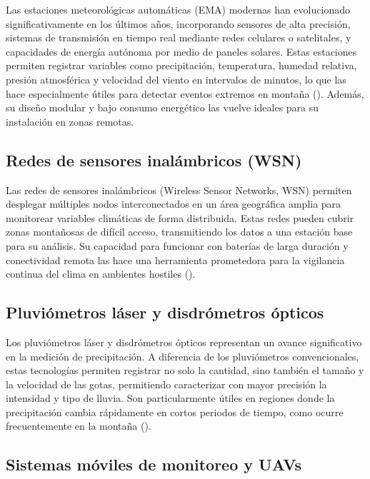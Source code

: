Las estaciones meteorológicas automáticas (EMA) modernas han evolucionado significativamente en los últimos años, incorporando sensores de alta precisión, sistemas de transmisión en tiempo real mediante redes celulares o satelitales, y capacidades de energía autónoma por medio de paneles solares. Estas estaciones permiten registrar variables como precipitación, temperatura, humedad relativa, presión atmosférica y velocidad del viento en intervalos de minutos, lo que las hace especialmente útiles para detectar eventos extremos en montaña (\cite{sabziparvar2019estimation}). Además, su diseño modular y bajo consumo energético las vuelve ideales para su instalación en zonas remotas.

\subsection{Redes de sensores inalámbricos (WSN)}

Las redes de sensores inalámbricos (Wireless Sensor Networks, WSN) permiten desplegar múltiples nodos interconectados en un área geográfica amplia para monitorear variables climáticas de forma distribuida. Estas redes pueden cubrir zonas montañosas de difícil acceso, transmitiendo los datos a una estación base para su análisis. Su capacidad para funcionar con baterías de larga duración y conectividad remota las hace una herramienta prometedora para la vigilancia continua del clima en ambientes hostiles (\cite{matese2009wireless}).

\subsection{Pluviómetros láser y disdrómetros ópticos}

Los pluviómetros láser y disdrómetros ópticos representan un avance significativo en la medición de precipitación. A diferencia de los pluviómetros convencionales, estas tecnologías permiten registrar no solo la cantidad, sino también el tamaño y la velocidad de las gotas, permitiendo caracterizar con mayor precisión la intensidad y tipo de lluvia. Son particularmente útiles en regiones donde la precipitación cambia rápidamente en cortos periodos de tiempo, como ocurre frecuentemente en la montaña (\cite{lenz2017optical}).

\subsection{Sistemas móviles de monitoreo y UAVs}

